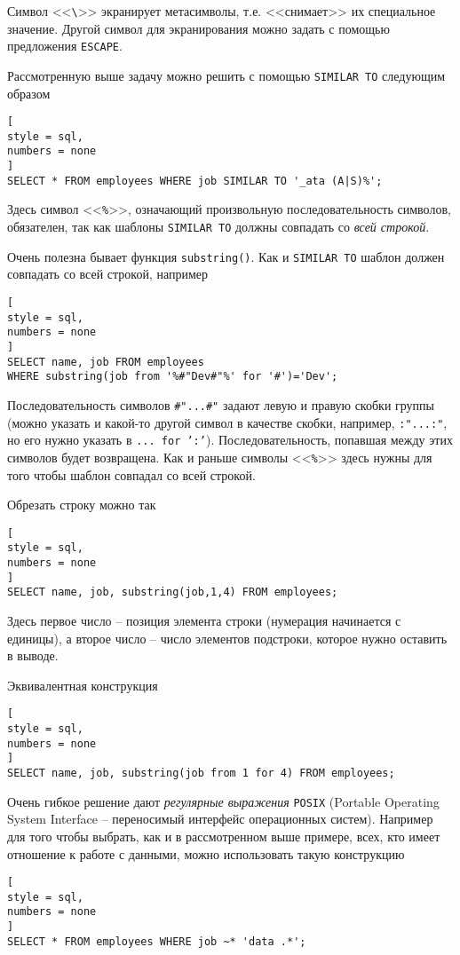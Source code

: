 \documentclass[%
	11pt,
	a4paper,
	utf8,
		]{article}
\begin{document}
Символ <<\verb|\|>> экранирует метасимволы, т.е. <<снимает>> их специальное значение. Другой символ для экранирования можно задать с помощью предложения \texttt{ESCAPE}.

Рассмотренную выше задачу можно решить с помощью \texttt{SIMILAR TO} следующим образом
\begin{lstlisting}[
style = sql,
numbers = none
]
SELECT * FROM employees WHERE job SIMILAR TO '_ata (A|S)%';
\end{lstlisting}

Здесь символ <<\texttt{\%}>>, означающий произвольную последовательность символов, обязателен, так как шаблоны \texttt{SIMILAR TO} должны совпадать со \emph{всей строкой}.

Очень полезна бывает функция \texttt{substring()}. Как и \texttt{SIMILAR TO} шаблон должен совпадать со всей строкой, например
\begin{lstlisting}[
style = sql,
numbers = none
]
SELECT name, job FROM employees
WHERE substring(job from '%#"Dev#"%' for '#')='Dev';
\end{lstlisting}

Последовательность символов \texttt{\#"...\#"} задают левую и правую скобки группы (можно указать и какой-то другой символ в качестве скобки, например, \texttt{:"...:"}, но его нужно указать в \texttt{... for ':'}). Последовательность, попавшая между этих символов будет возвращена. Как и раньше символы <<\texttt{\%}>> здесь нужны для того чтобы шаблон совпадал со всей строкой.

Обрезать строку можно так
\begin{lstlisting}[
style = sql,
numbers = none
]
SELECT name, job, substring(job,1,4) FROM employees;
\end{lstlisting}

Здесь первое число -- позиция элемента строки (нумерация начинается с единицы), а второе число -- число элементов подстроки, которое нужно оставить в выводе.

Эквивалентная конструкция
\begin{lstlisting}[
style = sql,
numbers = none
]
SELECT name, job, substring(job from 1 for 4) FROM employees;
\end{lstlisting}

Очень гибкое решение дают \emph{регулярные выражения} \texttt{POSIX} (Portable Operating System Interface -- переносимый интерфейс операционных систем). Например для того чтобы выбрать, как и в рассмотренном выше примере, всех, кто имеет отношение к работе с данными, можно использовать такую конструкцию
\begin{lstlisting}[
style = sql,
numbers = none
]
SELECT * FROM employees WHERE job ~* 'data .*';
\end{lstlisting}
\end{document}
